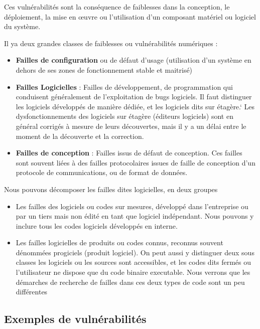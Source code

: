 Ces vulnérabilités sont la conséquence de faiblesses dans la conception, le déploiement, la mise en œuvre ou l'utilisation d'un composant matériel ou logiciel du système. 

Il ya deux grandes classes de faiblesses ou vulnérabilités numériques :

\begin{itemize}
\item \textbf{Failles de configuration} ou de défaut d’usage (utilisation d’un système en dehors de ses zones de fonctionnement stable et maitrisé)
\item \textbf{Failles Logicielles } : Failles de développement, de programmation qui conduisent généralement de l'exploitation de bugs logiciels. Il faut distinguer les logiciels développés de manière dédiée, et les logiciels dits sur étagère.`
Les dysfonctionnements des logiciels sur étagère (éditeurs logiciels) sont en général corrigés à mesure de leurs découvertes, mais il y a un délai entre le moment de la découverte et la correction.
\item \textbf{Failles de conception} : Failles issus de défaut de conception. Ces failles sont souvent liées à des failles protocolaires issues de faille de conception d'un protocole de communications, ou de format de données.
\end{itemize}

Nous pouvons décomposer les failles dites logicielles, en deux groupes 
\begin{itemize}
\item Les failles des logiciels ou codes sur mesures, développé dans l'entreprise ou par un tiers mais non édité en tant que logiciel indépendant. Nous pouvons y inclure tous les codes logiciels développés en interne.
\item Les failles logicielles de produits ou codes connus, reconnus souvent dénommées progiciels (produit logiciel). On peut aussi y distinguer deux sous classes les logiciels ou les sources sont accessibles, et les codes dits fermés ou l'utilisateur ne dispose que du code binaire executable. Nous verrons que les démarches de recherche de failles dans ces deux types de code sont un peu différentes
\end{itemize}


\subsection{Exemples de vulnérabilités}

